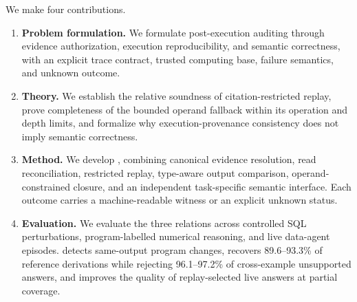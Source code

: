 We make four contributions.
\begin{enumerate}
    \setlength{\itemsep}{0pt}
    \setlength{\parskip}{0pt}

    \item \textbf{Problem formulation.}
    We formulate post-execution auditing through evidence authorization,
    execution reproducibility, and semantic correctness, with an explicit
    trace contract, trusted computing base, failure semantics, and unknown
    outcome.

    \item \textbf{Theory.}
    We establish the relative soundness of citation-restricted replay,
    prove completeness of the bounded operand fallback within its operation
    and depth limits, and formalize why execution-provenance consistency
    does not imply semantic correctness.

    \item \textbf{Method.}
    We develop \ledger, combining canonical evidence resolution,
    read reconciliation, restricted replay, type-aware output comparison,
    operand-constrained closure, and an independent task-specific semantic
    interface. Each outcome carries a machine-readable witness or an
    explicit unknown status.

    \item \textbf{Evaluation.}
    We evaluate the three relations across controlled SQL perturbations,
    program-labelled numerical reasoning, and live data-agent episodes.
    \ledger detects same-output program changes, recovers
    89.6--93.3\% of reference derivations while rejecting
    96.1--97.2\% of cross-example unsupported answers, and improves the
    quality of replay-selected live answers at partial coverage.
\end{enumerate}
